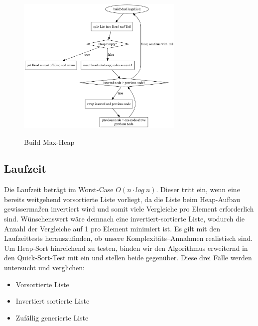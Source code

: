 \documentclass[11pt]{article}
\begin{document}
    \begin{figure}[hbt]
        \caption{Build Max-Heap}
        \centering
        \includegraphics[width = 8cm]{buildMaxHeap.pdf}\label{fig:buildMaxHeap}
    \end{figure}

    \subsection{Laufzeit}\label{subsec:Hlaufzeit}
    Die Laufzeit beträgt im Worst-Case \(O(n\cdot log\ n)\). Dieser tritt
    ein, wenn eine bereits weitgehend vorsortierte Liste vorliegt, da die
    Liste beim Heap-Aufbau gewissermaßen invertiert wird und somit viele
    Vergleiche pro Element erforderlich sind.
    Wünschenswert wäre demnach eine invertiert-sortierte Liste, wodurch die
    Anzahl der Vergleiche auf 1 pro Element minimiert ist.
    Es gilt mit den Laufzeittests herauszufinden, ob unsere
    Komplexitäts--Annahmen realistisch sind.
    Um Heap-Sort hinreichend zu testen, binden wir den Algorithmus erweiternd
    in den Quick-Sort-Test mit ein und stellen beide gegenüber.
    Diese drei Fälle werden untersucht und verglichen:
    \begin{itemize}
        \item Vorsortierte Liste
        \item Invertiert sortierte Liste
        \item Zufällig generierte Liste
    \end{itemize}
\end{document}
